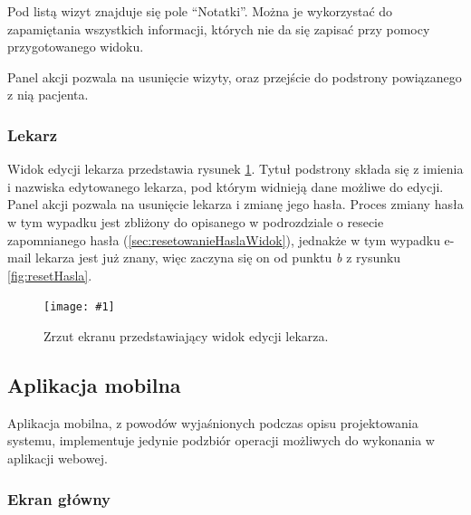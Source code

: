 \documentclass[11pt]{aghdpl}
\newcommand{\fullWidthPicture}[2]{
\begin{figure}[h!]
	\centering
		\texttt{[image: \#1]}
	\caption{#2}
	\label{fig:#1}
\end{figure}
}
\begin{document}
Pod listą wizyt znajduje się pole ``Notatki''. Można je wykorzystać do zapamiętania wszystkich informacji, których nie da się zapisać przy pomocy przygotowanego widoku.

Panel akcji pozwala na usunięcie wizyty, oraz przejście do podstrony powiązanego z nią pacjenta.

\subsubsection{Lekarz}
\label{sec:lekarz}

Widok edycji lekarza przedstawia rysunek \ref{fig:lekarz}. Tytuł podstrony składa się z imienia i nazwiska edytowanego lekarza, pod którym widnieją dane możliwe do edycji. Panel akcji pozwala na usunięcie lekarza i zmianę jego hasła. Proces zmiany hasła w tym wypadku jest zbliżony do opisanego w podrozdziale o resecie zapomnianego hasła (\ref{sec:resetowanieHaslaWidok}), jednakże w tym wypadku e-mail lekarza jest już znany, więc zaczyna się on od punktu \emph{b} z rysunku \ref{fig:resetHasla}.

\fullWidthPicture{lekarz}{Zrzut ekranu przedstawiający widok edycji lekarza.}

\subsection{Aplikacja mobilna}


Aplikacja mobilna, z powodów wyjaśnionych podczas opisu projektowania systemu, implementuje jedynie podzbiór operacji możliwych do wykonania w aplikacji webowej.

\subsubsection{Ekran główny}



\subsubsection{}
\subsubsection{}
\subsubsection{}
\end{document}
